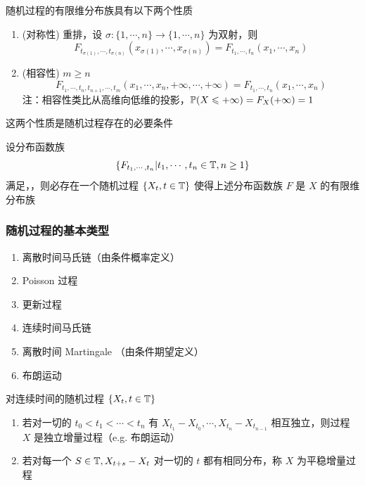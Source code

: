 \begin{property}
随机过程的有限维分布族具有以下两个性质
\begin{enumerate}
    \item (对称性) 重排，设 $\sigma:\{1,\cdots,n\}\rightarrow \{1,\cdots,n\}$ 为双射，则
    \[
    F_{t_{\sigma(1)}, \cdots,t_{\sigma(n)}}(x_{\sigma(1)},\cdots,x_{\sigma(n)})=F_{t_1,\cdots,t_n}(x_1,\cdots,x_n)
    \]
    \item (相容性) $m\geq n$
    \[
    F_{t_1,\cdots,t_n,t_{n+1},\cdots,t_m}(x_1,\cdots,x_n,+\infty,\cdots,+\infty)=F_{t_1,\cdots,t_n}(x_1,\cdots,x_n)
    \]
    注：相容性类比从高维向低维的投影，$\mathbb{P}(X\leqslant +\infty)=F_X(+\infty)=1$
\end{enumerate}
这两个性质是随机过程存在的必要条件
\end{property}

\begin{theorem}[Kolmogorov定理]
    设分布函数族
    \[
    \{F_{t_1,\cdots,t_n}|t_1,\cdots,t_n\in \mathbb{T},n\geq 1\}
    \]
    满足，，则必存在一个随机过程 $\{X_t,t\in \mathbb{T}\}$ 使得上述分布函数族 $F$ 是 $X$ 的有限维分布族
\end{theorem}

\subsubsection{随机过程的基本类型}

\begin{enumerate}
    \item 离散时间马氏链（由条件概率定义）
    \item Poisson 过程
    \item 更新过程
    \item 连续时间马氏链
    \item 离散时间 Martingale （由条件期望定义）
    \item 布朗运动
\end{enumerate}

\begin{definition}
    对连续时间的随机过程 $\{X_t,t\in \mathbb{T}\}$
    \begin{enumerate}
        \item 若对一切的 $t_0<t_1<\cdots<t_n$ 有 $X_{t_1}-X_{t_0},\cdots,X_{t_n}-X_{t_{n-1}}$ 相互独立，则过程 $X$ 是独立增量过程（e.g. 布朗运动）
        \item 若对每一个 $S\in \mathbb{T}, X_{t+s}-X_t$ 对一切的 $t$ 都有相同分布，称 $X$ 为平稳增量过程
    \end{enumerate}
\end{definition}